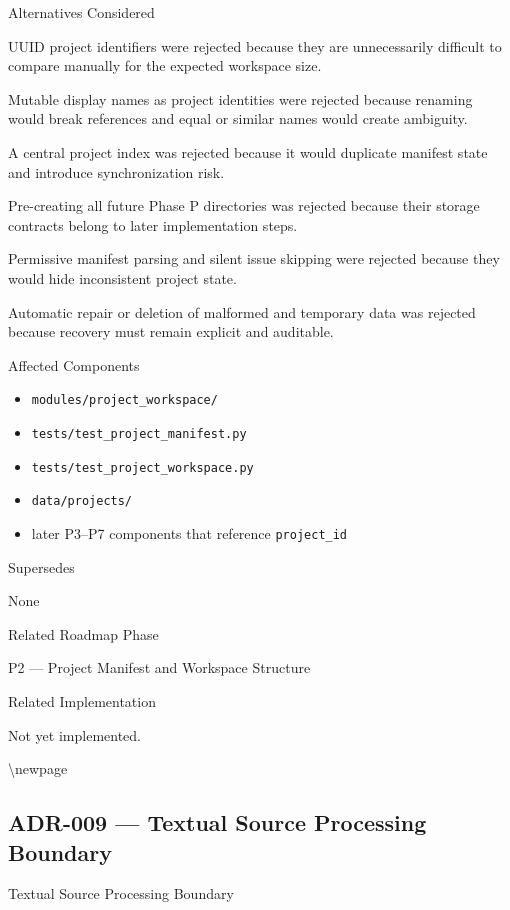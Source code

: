 Alternatives Considered

UUID project identifiers were rejected because they are unnecessarily difficult to compare manually for the expected workspace size.

Mutable display names as project identities were rejected because renaming would break references and equal or similar names would create ambiguity.

A central project index was rejected because it would duplicate manifest state and introduce synchronization risk.

Pre-creating all future Phase P directories was rejected because their storage contracts belong to later implementation steps.

Permissive manifest parsing and silent issue skipping were rejected because they would hide inconsistent project state.

Automatic repair or deletion of malformed and temporary data was rejected because recovery must remain explicit and auditable.

Affected Components

\begin{itemize}
\tightlist
\item
  \texttt{modules/project\_workspace/}
\item
  \texttt{tests/test\_project\_manifest.py}
\item
  \texttt{tests/test\_project\_workspace.py}
\item
  \texttt{data/projects/}
\item
  later P3--P7 components that reference \texttt{project\_id}
\end{itemize}

Supersedes

None

Related Roadmap Phase

P2 --- Project Manifest and Workspace Structure

Related Implementation

Not yet implemented.

\textbackslash newpage

\hypertarget{adr-009--textual-source-processing-boundary}{%
\subsection{ADR-009 --- Textual Source Processing Boundary}\label{adr-009--textual-source-processing-boundary}}

Textual Source Processing Boundary

